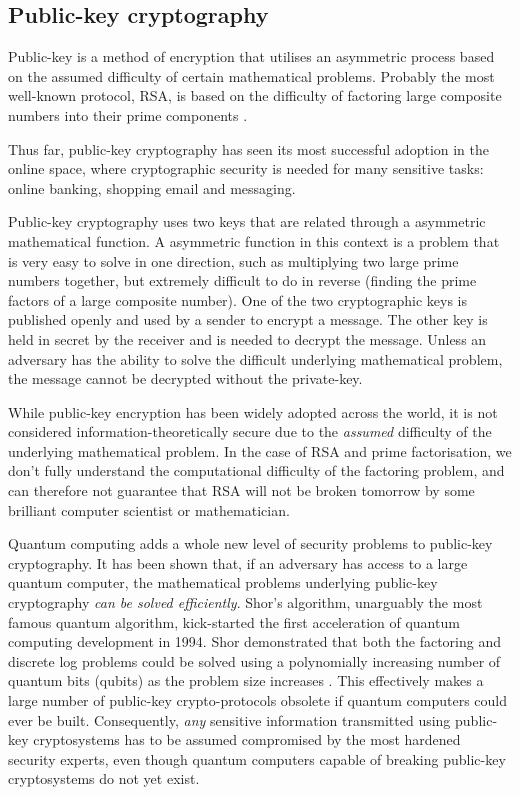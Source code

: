 \documentclass[twocolumn, aps, rmp, amsmath, amssymb, nofootinbib, superscriptaddress, longbibliography, floatfix, table-of-contents, eqsecnum]{revtex4-2}
\begin{document}
\subsection{Public-key cryptography}

Public-key is a method of encryption that utilises an asymmetric process based on the assumed difficulty of certain mathematical problems. Probably the most well-known protocol, RSA, is based on the difficulty of factoring large composite numbers into their prime components \cite{?}. 

Thus far, public-key cryptography has seen its most successful adoption in the online space, where cryptographic security is needed for many sensitive tasks: online banking, shopping email and messaging. 

Public-key cryptography uses two keys that are related through a asymmetric mathematical function. A asymmetric function in this context is a problem that is very easy to solve in one direction, such as multiplying two large prime numbers together, but extremely difficult to do in reverse (finding the prime factors of a large composite number). One of the two cryptographic keys is published openly and used by a sender to encrypt a message. The other key is held in secret by the receiver and is needed to decrypt the message. Unless an adversary has the ability to solve the difficult underlying mathematical problem, the message cannot be decrypted without the private-key. 

While public-key encryption has been widely adopted across the world, it is not considered information-theoretically secure due to the \textit{assumed} difficulty of the underlying mathematical problem. In the case of RSA and prime factorisation, we don't fully understand the computational difficulty of the factoring problem, and can therefore not guarantee that RSA will not be broken tomorrow by some brilliant computer scientist or mathematician. 

Quantum computing adds a whole new level of security problems to public-key cryptography. It has been shown that, if an adversary has access to a large quantum computer, the mathematical problems underlying public-key cryptography \textit{can be solved efficiently}. Shor's algorithm, unarguably the most famous quantum algorithm, kick-started the first acceleration of quantum computing development in 1994. Shor demonstrated that both the factoring and discrete log problems could be solved using a polynomially increasing number of quantum bits (qubits) as the problem size increases \cite{?}. This effectively makes a large number of public-key crypto-protocols obsolete if quantum computers could ever be built. Consequently, \textit{any} sensitive information transmitted using public-key cryptosystems has to be assumed compromised by the most hardened security experts, even though quantum computers capable of breaking public-key cryptosystems do not yet exist. 
\end{document}
